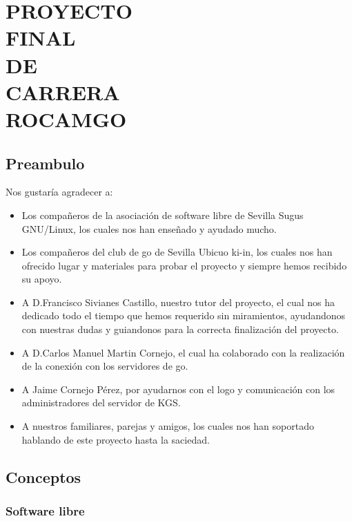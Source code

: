 \documentclass[12pt,a4paper]{report}
\author{David Medina Velasco \and Víctor Ramírez de la Corte}
\begin{document}
\part*{PROYECTO\\ FINAL\\ DE \\CARRERA \\ ROCAMGO\\}

\marginsize{3cm}{2cm}{2cm}{2cm} %
\tableofcontents  %

 
\chapter*{Preambulo} 

Nos gustaría agradecer a: 
\begin{itemize} 
    \item Los compañeros de la asociación de software libre de Sevilla Sugus 
    GNU/Linux, los cuales nos han enseñado y ayudado mucho.  
    \item Los compañeros del club de go de Sevilla Ubicuo ki-in, los cuales nos
    han ofrecido lugar y materiales para probar el proyecto y siempre hemos 
    recibido su apoyo.  
    \item A D.Francisco Sivianes Castillo, nuestro tutor del proyecto, el cual 
    nos ha dedicado todo el tiempo que hemos requerido sin miramientos, 
    ayudandonos con nuestras dudas y guiandonos para la correcta finalización 
    del proyecto.  
    \item A D.Carlos Manuel Martin Cornejo, el cual ha colaborado con la 
    realización de la conexión con los servidores de go.  
    \item A Jaime Cornejo Pérez, por ayudarnos con el logo y comunicación con 
    los administradores del servidor de KGS.  
    \item A nuestros familiares, parejas y amigos, los cuales nos han soportado 
    hablando de este proyecto hasta la saciedad.  
\end{itemize}


\chapter{Conceptos} \section{Software libre}
\end{document}
